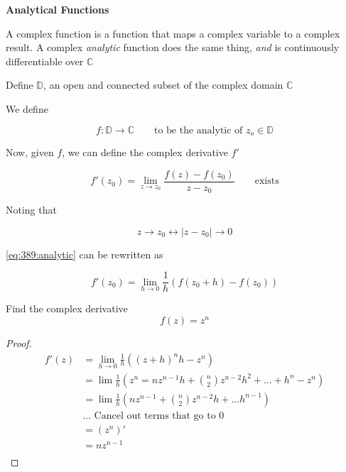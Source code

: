 \documentclass[../notes.tex]{subfiles}
\begin{document}
\begin{definition}
	\textbf{Analytical Functions}

	A complex function is a function that maps a complex variable to a complex result. 
	A complex \textit{analytic} function does the same thing, \textit{and} is continuously differentiable over $ \mathbb{C} $  



	Define $ \mathbb{D} $, an open and connected subset of the complex domain $ \mathbb{C} $

	We define

	\begin{equation}
		f: \mathbb{D} \rightarrow \mathbb{C} \qquad\text{to be the analytic of } z_o \in \mathbb{D}
	\end{equation}


	Now, given $ f $, we can define the complex derivative $ f' $ 


	\begin{equation}
		f'(z_0) = \lim_{z \to z_0 }\frac{f(z) - f(z_0)}{ z-z_0 } \qquad \text{exists}
		\label{eq:389:analytic}
	\end{equation}

	Noting that 

	\begin{equation}
		z \to z_0 \leftrightarrow |z - z_0| \to 0
	\end{equation}

	\eqref{eq:389:analytic}	can be rewritten as

	\begin{equation}
		f'(z_0) = \lim_{h\to0} \frac{1}{h}(f(z_0 + h) - f(z_0))
	\end{equation}

\end{definition}

\begin{example}
	Find the complex derivative
	\begin{equation}
		f(z) = z^n
	\end{equation}
	\begin{proof}

	\begin{equation}
		\begin{split}
			f'(z) &= \lim_{h\to0} \frac{1}{h} \left(  (z+h)^n h - z^n \right) \\
						&= \lim \frac{1}{h} \left( z^n = nz^{n-1}h + \binom{n}{2}z^{n-2}h^2 + \ldots + h^n-z^n\right)   \\
						&= \lim \frac{1}{h} \left( nz^{n-1} + \binom{n}{2}z^{n-2}h + \ldots h^{n-1} \right)   \\
						& \text{... Cancel out terms that go to 0} \\
						&= (z^n)' \\
						&= nz^{n-1} \\
		\end{split}
	\end{equation}

\end{proof}
	
	
\end{example}
\end{document}
